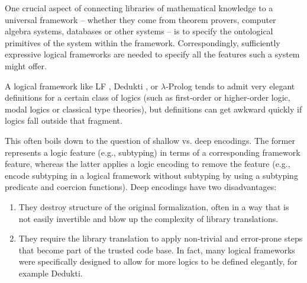 One crucial aspect of connecting libraries of mathematical knowledge to a universal framework -- whether they come from theorem provers, computer algebra systems, databases or other systems -- is to specify the ontological primitives of the system within the framework. Correspondingly, sufficiently expressive logical frameworks are needed to specify all the features such a system might offer.

A logical framework like LF \cite{HarperEtAl:affdl93}, Dedukti \cite{dedukti}, or $\lambda$-Prolog \cite{lambdaprolog} tends to admit very elegant definitions for a certain class of logics (such as first-order or higher-order logic, modal logics or classical type theories), but definitions can get awkward quickly if logics fall outside that fragment.

This often boils down to the question of shallow vs. deep encodings.  The former
represents a logic feature (e.g., subtyping) in terms of a corresponding framework
feature, whereas the latter applies a logic encoding to remove the feature (e.g., encode
subtyping in a logical framework without subtyping by using a subtyping predicate and
coercion functions).  Deep encodings have two disadvantages: 
\begin{enumerate}
	\item They destroy structure of
the original formalization, often in a way that is not easily invertible and blow up the
complexity of library translations.  
	\item They require the library translation to apply
non-trivial and error-prone steps that become part of the trusted code base.  In fact,
many logical frameworks were specifically designed to allow for more logics to be defined elegantly, for example Dedukti.
\end{enumerate}

